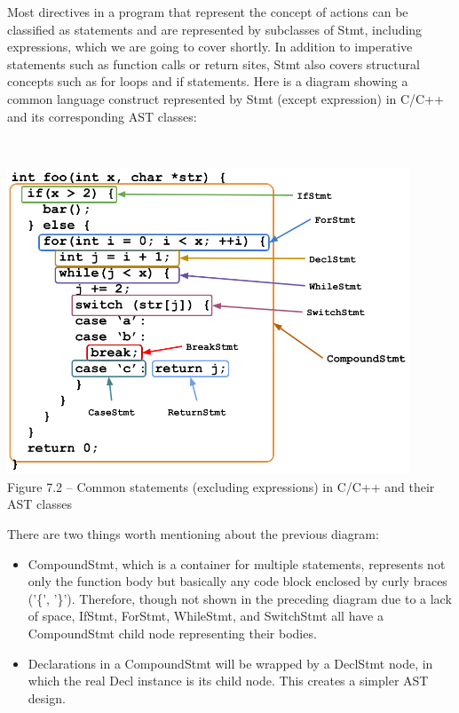 Most directives in a program that represent the concept of actions can be classified as statements and are represented by subclasses of Stmt, including expressions, which we are going to cover shortly. In addition to imperative statements such as function calls or return sites, Stmt also covers structural concepts such as for loops and if statements. Here is a diagram showing a common language construct represented by Stmt (except expression) in C/C++ and its corresponding AST classes:


\hspace*{\fill} \\ %
\begin{center}
\includegraphics[width=0.9\textwidth]{content/2/chapter7/images/2.png}\\
Figure 7.2 – Common statements (excluding expressions) in C/C++ and their AST classes
\end{center}

There are two things worth mentioning about the previous diagram:

\begin{itemize}
\item CompoundStmt, which is a container for multiple statements, represents not only the function body but basically any code block enclosed by curly braces ('\{', '\}'). Therefore, though not shown in the preceding diagram due to a lack of space, IfStmt, ForStmt, WhileStmt, and SwitchStmt all have a CompoundStmt child node representing their bodies.

\item Declarations in a CompoundStmt will be wrapped by a DeclStmt node, in which the real Decl instance is its child node. This creates a simpler AST design.
\end{itemize}

